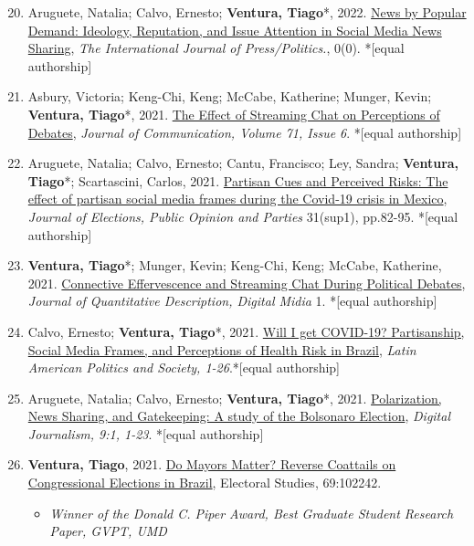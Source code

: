\documentclass[letterpaper, 11pt]{article}
\newenvironment{benumerate}[1]{
    \let\oldItem\item
    \def\item{\addtocounter{enumi}{-2}\oldItem}
    \begin{enumerate}[leftmargin=2em]
    \setcounter{enumi}{#1}
    \addtocounter{enumi}{1}
}{
    \end{enumerate}
}
\begin{document}
\begin{benumerate}{19}
        \item Aruguete, Natalia; Calvo, Ernesto; \textbf{Ventura, Tiago}*, 2022. \href{https://journals.sagepub.com/doi/abs/10.1177/19401612211057068}{News by Popular Demand: Ideology, Reputation, and Issue Attention in Social Media News Sharing}, \textit{The International Journal of Press/Politics.}, 0(0). *[equal authorship]


        \item  Asbury, Victoria; Keng-Chi, Keng; McCabe, Katherine; Munger, Kevin; \textbf{Ventura, Tiago}*, 2021. \href{https://academic.oup.com/joc/article-abstract/71/6/947/6415947}{The Effect of Streaming Chat on Perceptions of Debates},  \textit{Journal of Communication, Volume 71, Issue 6}. *[equal authorship]

        \item Aruguete, Natalia; Calvo, Ernesto; Cantu, Francisco; Ley, Sandra; \textbf{Ventura, Tiago}*; Scartascini, Carlos, 2021. \href{https://www.tandfonline.com/doi/abs/10.1080/17457289.2021.1924740}{Partisan Cues and Perceived Risks: The effect of partisan social media frames during the Covid-19 crisis in Mexico},  \textit{Journal of Elections, Public Opinion and Parties} 31(sup1), pp.82-95. *[equal authorship]

        \item \textbf{Ventura, Tiago}*;  Munger, Kevin; Keng-Chi, Keng; McCabe, Katherine, 2021. \href{https://journalqd.org/article/view/2573}{Connective Effervescence and Streaming Chat
        During Political Debates}, \textit{Journal of Quantitative Description, Digital Midia} 1. *[equal authorship]

        \item  Calvo, Ernesto; \textbf{Ventura, Tiago}*, 2021. \href{http://venturatiago.com/files/Calvo_Ventura_Covid_Social_Media.pdf}{Will I get COVID-19? Partisanship, Social Media Frames, and Perceptions of Health Risk in Brazil}, \textit{Latin American Politics and Society, 1-26}.*[equal authorship]

        \item  Aruguete, Natalia; Calvo, Ernesto; \textbf{Ventura, Tiago}*, 2021. \href{https://www.tandfonline.com/doi/abs/10.1080/21670811.2020.1852094}{Polarization, News Sharing, and Gatekeeping: A study of the Bolsonaro Election}, \textit{Digital Journalism, 9:1, 1-23}. *[equal authorship]

        \item \textbf{Ventura, Tiago}, 2021. \href{https://www.sciencedirect.com/science/article/pii/S0261379420301219?dgcid=author}{Do Mayors Matter? Reverse Coattails on Congressional Elections in Brazil}, Electoral Studies, 69:102242.
            \begin{itemize}[leftmargin=*]
            \item \textit{Winner of the Donald C. Piper Award, Best Graduate Student Research Paper, GVPT, UMD}
            \end{itemize}


    \end{benumerate}
\end{document}

